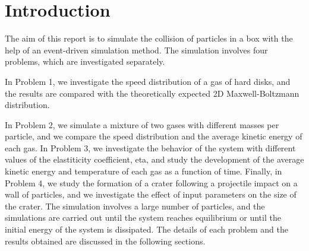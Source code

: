 \section{Introduction}

The aim of this report is to simulate the collision of particles in a box with the help of an event-driven simulation method. 
The simulation involves four problems, which are investigated separately. 

In Problem 1, we investigate the speed distribution of a gas of 
hard disks, and the results are compared with the theoretically 
expected 2D Maxwell-Boltzmann distribution. 


In Problem 2, we simulate a mixture of two gases with different 
masses per particle, and we compare the speed distribution and 
the average kinetic energy of each gas. In Problem 3, we investigate 
the behavior of the system with different values of the elastiticity 
coefficient, eta, and study the development of the average kinetic energy 
and temperature of each gas as a function of time. Finally, in Problem 4, 
we study the formation of a crater following a projectile impact 
on a wall of particles, and we investigate the effect of input 
parameters on the size of the crater. The simulation involves a 
large number of particles, and the simulations are carried out 
until the system reaches equilibrium or until the initial energy 
of the system is dissipated. The details of each problem and the 
results obtained are discussed in the following sections.

